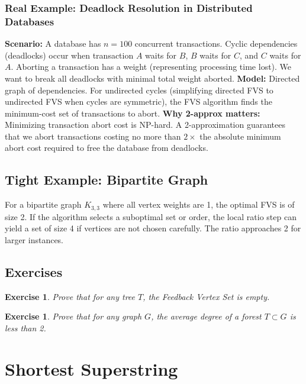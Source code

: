 \documentclass[11pt,oneside]{book}
\newtheorem{exercise}[theorem]{Exercise}
\begin{document}
\subsection*{Real Example: Deadlock Resolution in Distributed Databases}
\textbf{Scenario:} A database has $n=100$ concurrent transactions. Cyclic dependencies (deadlocks) occur when transaction $A$ waits for $B$, $B$ waits for $C$, and $C$ waits for $A$. Aborting a transaction has a weight (representing processing time lost). We want to break all deadlocks with minimal total weight aborted.
\textbf{Model:} Directed graph of dependencies. For undirected cycles (simplifying directed FVS to undirected FVS when cycles are symmetric), the FVS algorithm finds the minimum-cost set of transactions to abort.
\textbf{Why 2-approx matters:} Minimizing transaction abort cost is NP-hard. A 2-approximation guarantees that we abort transactions costing no more than $2\times$ the absolute minimum abort cost required to free the database from deadlocks.

\section{Tight Example: Bipartite Graph}
For a bipartite graph $K_{3,3}$ where all vertex weights are 1, the optimal FVS is of size 2. If the algorithm selects a suboptimal set or order, the local ratio step can yield a set of size 4 if vertices are not chosen carefully. The ratio approaches 2 for larger instances.

\section{Exercises}
\begin{exercise}
Prove that for any tree $T$, the Feedback Vertex Set is empty.
\end{exercise}
\begin{exercise}
Prove that for any graph $G$, the average degree of a forest $T \subset G$ is less than 2.
\end{exercise}

\chapter{Shortest Superstring}
\label{ch:superstring}
\end{document}
